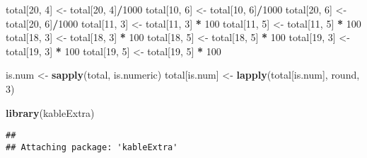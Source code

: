 \documentclass[]{tufte-handout}
\newenvironment{Shaded}{\begin{snugshade}}{\end{snugshade}}
\newcommand{\KeywordTok}[1]{\textcolor[rgb]{0.13,0.29,0.53}{\textbf{#1}}}
\newcommand{\DecValTok}[1]{\textcolor[rgb]{0.00,0.00,0.81}{#1}}
\newcommand{\StringTok}[1]{\textcolor[rgb]{0.31,0.60,0.02}{#1}}
\newcommand{\OperatorTok}[1]{\textcolor[rgb]{0.81,0.36,0.00}{\textbf{#1}}}
\newcommand{\NormalTok}[1]{#1}
\begin{document}
\begin{Shaded}
\begin{Highlighting}[]
\NormalTok{total[}\DecValTok{20}\NormalTok{, }\DecValTok{4}\NormalTok{] <-}\StringTok{ }\NormalTok{total[}\DecValTok{20}\NormalTok{, }\DecValTok{4}\NormalTok{]}\OperatorTok{/}\DecValTok{1000}
\NormalTok{total[}\DecValTok{10}\NormalTok{, }\DecValTok{6}\NormalTok{] <-}\StringTok{ }\NormalTok{total[}\DecValTok{10}\NormalTok{, }\DecValTok{6}\NormalTok{]}\OperatorTok{/}\DecValTok{1000}
\NormalTok{total[}\DecValTok{20}\NormalTok{, }\DecValTok{6}\NormalTok{] <-}\StringTok{ }\NormalTok{total[}\DecValTok{20}\NormalTok{, }\DecValTok{6}\NormalTok{]}\OperatorTok{/}\DecValTok{1000}
\NormalTok{total[}\DecValTok{11}\NormalTok{, }\DecValTok{3}\NormalTok{] <-}\StringTok{ }\NormalTok{total[}\DecValTok{11}\NormalTok{, }\DecValTok{3}\NormalTok{] }\OperatorTok{*}\StringTok{ }\DecValTok{100}
\NormalTok{total[}\DecValTok{11}\NormalTok{, }\DecValTok{5}\NormalTok{] <-}\StringTok{ }\NormalTok{total[}\DecValTok{11}\NormalTok{, }\DecValTok{5}\NormalTok{] }\OperatorTok{*}\StringTok{ }\DecValTok{100}
\NormalTok{total[}\DecValTok{18}\NormalTok{, }\DecValTok{3}\NormalTok{] <-}\StringTok{ }\NormalTok{total[}\DecValTok{18}\NormalTok{, }\DecValTok{3}\NormalTok{] }\OperatorTok{*}\StringTok{ }\DecValTok{100}
\NormalTok{total[}\DecValTok{18}\NormalTok{, }\DecValTok{5}\NormalTok{] <-}\StringTok{ }\NormalTok{total[}\DecValTok{18}\NormalTok{, }\DecValTok{5}\NormalTok{] }\OperatorTok{*}\StringTok{ }\DecValTok{100}
\NormalTok{total[}\DecValTok{19}\NormalTok{, }\DecValTok{3}\NormalTok{] <-}\StringTok{ }\NormalTok{total[}\DecValTok{19}\NormalTok{, }\DecValTok{3}\NormalTok{] }\OperatorTok{*}\StringTok{ }\DecValTok{100}
\NormalTok{total[}\DecValTok{19}\NormalTok{, }\DecValTok{5}\NormalTok{] <-}\StringTok{ }\NormalTok{total[}\DecValTok{19}\NormalTok{, }\DecValTok{5}\NormalTok{] }\OperatorTok{*}\StringTok{ }\DecValTok{100}


\NormalTok{is.num <-}\StringTok{ }\KeywordTok{sapply}\NormalTok{(total, is.numeric)}
\NormalTok{total[is.num] <-}\StringTok{ }\KeywordTok{lapply}\NormalTok{(total[is.num], round, }
    \DecValTok{3}\NormalTok{)}
\end{Highlighting}
\end{Shaded}

\begin{Shaded}
\begin{Highlighting}[]
\KeywordTok{library}\NormalTok{(kableExtra)}
\end{Highlighting}
\end{Shaded}

\begin{verbatim}
## 
## Attaching package: 'kableExtra'
\end{verbatim}
\end{document}
